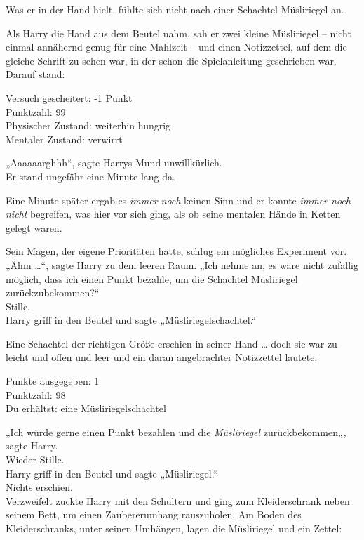 {Was er in der Hand hielt, fühlte sich nicht nach einer Schachtel Müsliriegel an.

Als Harry die Hand aus dem Beutel nahm, sah er zwei kleine Müsliriegel -- nicht einmal annähernd genug für eine Mahlzeit -- und einen Notizzettel, auf dem die gleiche Schrift zu sehen war, in der schon die Spielanleitung geschrieben war.\\ Darauf stand:

Versuch gescheitert: -1 Punkt\\ Punktzahl: 99\\ Physischer Zustand: weiterhin hungrig\\ Mentaler Zustand: verwirrt

„Aaaaaarghhh“, sagte Harrys Mund unwillkürlich.\\ Er stand ungefähr eine Minute lang da.

Eine Minute später ergab es \emph{immer noch} keinen Sinn und er konnte \emph{immer noch nicht} begreifen, was hier vor sich ging, als ob seine mentalen Hände in Ketten gelegt waren.

Sein Magen, der eigene Prioritäten hatte, schlug ein mögliches Experiment vor.\\ „Ähm …“, sagte Harry zu dem leeren Raum. „Ich nehme an, es wäre nicht zufällig möglich, dass ich einen Punkt bezahle, um die Schachtel Müsliriegel zurückzubekommen?“\\ Stille.\\ Harry griff in den Beutel und sagte „Müsliriegelschachtel.“

Eine Schachtel der richtigen Größe erschien in seiner Hand … doch sie war zu leicht und offen und leer und ein daran angebrachter Notizzettel lautete:

Punkte ausgegeben: 1\\ Punktzahl: 98\\ Du erhältst: eine Müsliriegelschachtel

„Ich würde gerne einen Punkt bezahlen und die \emph{Müsliriegel} zurückbekommen„, sagte Harry.\\ Wieder Stille.\\ Harry griff in den Beutel und sagte „Müsliriegel.“\\ Nichts erschien.\\ Verzweifelt zuckte Harry mit den Schultern und ging zum Kleiderschrank neben seinem Bett, um einen Zaubererumhang rauszuholen. Am Boden des Kleiderschranks, unter seinen Umhängen, lagen die Müsliriegel und ein Zettel:

}
